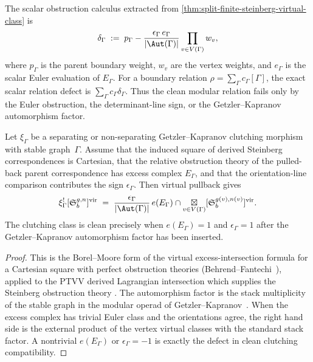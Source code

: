 The scalar obstruction calculus extracted from
\autoref{thm:split-finite-steinberg-virtual-class} is
\begin{equation}
\label{eq:steinberg-scalar-defect}
\delta_\Gamma
\;:=\;
p_\Gamma
-
\frac{\epsilon_\Gamma\,e_\Gamma}{|\Aut(\Gamma)|}
\prod_{v\in V(\Gamma)}w_v,
\end{equation}
where $p_\Gamma$ is the parent boundary weight, $w_v$ are the vertex
weights, and $e_\Gamma$ is the scalar Euler evaluation of
$E_\Gamma$. For a boundary relation
$\rho=\sum_\Gamma c_\Gamma[\Gamma]$, the exact scalar relation defect is
$\sum_\Gamma c_\Gamma\delta_\Gamma$. Thus the clean modular relation
fails only by the Euler obstruction, the determinant-line sign, or the
Getzler--Kapranov automorphism factor.

\begin{proposition}
\label{prop:steinberg-clean-pullback-criterion}
Let $\xi_\Gamma$ be a separating or non-separating
Getzler--Kapranov clutching morphism with stable graph~$\Gamma$.
Assume that the induced square of derived Steinberg correspondences is
Cartesian, that the relative obstruction theory of the pulled-back
parent correspondence has excess complex $E_\Gamma$, and that the
orientation-line comparison contributes the sign $\epsilon_\Gamma$.
Then virtual pullback gives
\begin{equation}
\label{eq:steinberg-excess-pullback}
\xi_\Gamma^![\fS_b^{g,n}]^{\mathrm{vir}}
\;=\;
\frac{\epsilon_\Gamma}{|\Aut(\Gamma)|}\,
e(E_\Gamma)\cap
\mathop{\boxtimes}\limits_{v\in V(\Gamma)}
[\fS_b^{g(v),n(v)}]^{\mathrm{vir}}.
\end{equation}
The clutching class is clean precisely when
$e(E_\Gamma)=1$ and $\epsilon_\Gamma=1$ after the
Getzler--Kapranov automorphism factor has been inserted.
\end{proposition}

\begin{proof}
This is the Borel--Moore form of the virtual excess-intersection
formula for a Cartesian square with perfect obstruction theories
(Behrend--Fantechi~\cite{BF97}), applied to the PTVV derived
Lagrangian intersection which supplies the Steinberg obstruction
theory \cite{PTVV13}. The automorphism factor is the stack
multiplicity of the stable graph in the modular operad of
Getzler--Kapranov~\cite{GeK98}. When the excess complex has trivial
Euler class and the orientations agree, the right hand side is the
external product of the vertex virtual classes with the standard
stack factor. A nontrivial $e(E_\Gamma)$ or $\epsilon_\Gamma=-1$
is exactly the defect in clean clutching compatibility.
\end{proof}

